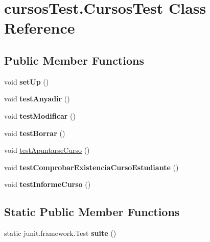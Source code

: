 \hypertarget{classcursos_test_1_1_cursos_test}{}\section{cursos\+Test.\+Cursos\+Test Class Reference}
\label{classcursos_test_1_1_cursos_test}
\subsection*{Public Member Functions}
\begin{DoxyCompactItemize}
\item 
\mbox{\label{classcursos_test_1_1_cursos_test_a4bffa6e907eb6cc113ada97c68f53078}} 
void {\bfseries set\+Up} ()
\item 
\mbox{\label{classcursos_test_1_1_cursos_test_a8e0042171dbdcf867b13943be12e9314}} 
void {\bfseries test\+Anyadir} ()
\item 
\mbox{\label{classcursos_test_1_1_cursos_test_a8746e35ea08cdcf491e42592bfb04a53}} 
void {\bfseries test\+Modificar} ()
\item 
\mbox{\label{classcursos_test_1_1_cursos_test_af5eae01c423a3b0a1f2540386b66b8f3}} 
void {\bfseries test\+Borrar} ()
\item 
void \hyperlink{classcursos_test_1_1_cursos_test_a00119e43545f51cb6b31b9c9d8356836}{test\+Apuntarse\+Curso} ()
\item 
\mbox{\label{classcursos_test_1_1_cursos_test_aa4a3ca5eff0f1dcba8bfd31fbf7f8237}} 
void {\bfseries test\+Comprobar\+Existencia\+Curso\+Estudiante} ()
\item 
\mbox{\label{classcursos_test_1_1_cursos_test_a7c0510889d378b2789985ce375a77958}} 
void {\bfseries test\+Informe\+Curso} ()
\end{DoxyCompactItemize}
\subsection*{Static Public Member Functions}
\begin{DoxyCompactItemize}
\item 
\mbox{\label{classcursos_test_1_1_cursos_test_a6a6ba72c59760097b01605e04e7aed6c}} 
static junit.\+framework.\+Test {\bfseries suite} ()
\end{DoxyCompactItemize}


